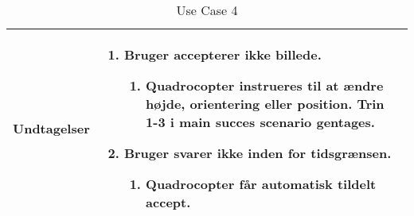 \begin{table}[H]
\begin{tabular}{|l|p{10cm}|}
Undtagelser							& 

									\renewcommand{\labelenumi}{\Roman{enumi}:}
									\renewcommand{\labelenumii}{\alph{enumii})}
									\begin{enumerate}[topsep=0.0cm,leftmargin=0.5cm]
										\item Bruger accepterer ikke billede.
											\begin{enumerate}[topsep=0cm, leftmargin=1cm]
												\item Quadrocopter instrueres til at ændre højde, orientering eller position. Trin 1-3 i main succes scenario gentages.
											\end{enumerate}
										\item Bruger svarer ikke inden for tidsgrænsen.
											\begin{enumerate}[topsep=0cm, leftmargin=1cm]
												\item Quadrocopter får automatisk tildelt accept.
											\end{enumerate}
									\end{enumerate} \\\hline	

\end{tabular}
\caption{Use Case 4}
\label{tab:UC4}
\end{table}